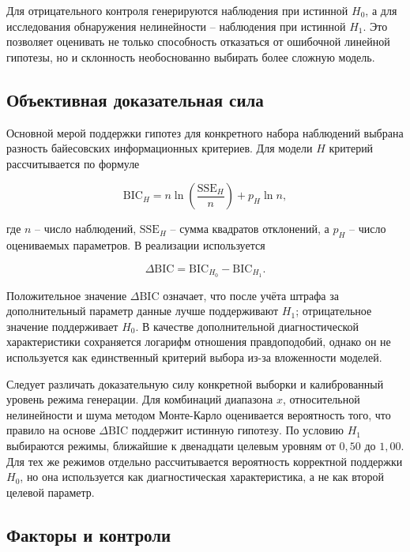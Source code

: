 \documentclass[a4paper,14pt]{extarticle}
\newcommand{\Hnull}{\ensuremath{H_0}}
\newcommand{\Hone}{\ensuremath{H_1}}
\newcommand{\DeltaBIC}{\ensuremath{\Delta\mathrm{BIC}}}
\begin{document}
Для отрицательного контроля генерируются наблюдения при истинной \Hnull, а для исследования обнаружения нелинейности -- наблюдения при истинной \Hone. Это позволяет оценивать не только способность отказаться от ошибочной линейной гипотезы, но и склонность необоснованно выбирать более сложную модель.

\subsection{Объективная доказательная сила}

Основной мерой поддержки гипотез для конкретного набора наблюдений выбрана разность байесовских информационных критериев. Для модели $H$ критерий рассчитывается по формуле~\cite{schwarz}

\begin{equation}
  \mathrm{BIC}_H = n \ln\!\left(\frac{\mathrm{SSE}_H}{n}\right) + p_H \ln n,
\end{equation}

где $n$ -- число наблюдений, $\mathrm{SSE}_H$ -- сумма квадратов отклонений, а $p_H$ -- число оцениваемых параметров. В реализации используется

\begin{equation}
  \DeltaBIC = \mathrm{BIC}_{H_0} - \mathrm{BIC}_{H_1}.
\end{equation}

Положительное значение \DeltaBIC{} означает, что после учёта штрафа за дополнительный параметр данные лучше поддерживают \Hone; отрицательное значение поддерживает \Hnull. В качестве дополнительной диагностической характеристики сохраняется логарифм отношения правдоподобий, однако он не используется как единственный критерий выбора из-за вложенности моделей.

Следует различать доказательную силу конкретной выборки и калиброванный уровень режима генерации. Для комбинаций диапазона $x$, относительной нелинейности и шума методом Монте-Карло оценивается вероятность того, что правило на основе \DeltaBIC{} поддержит истинную гипотезу. По условию \Hone{} выбираются режимы, ближайшие к двенадцати целевым уровням от $0{,}50$ до $1{,}00$. Для тех же режимов отдельно рассчитывается вероятность корректной поддержки \Hnull, но она используется как диагностическая характеристика, а не как второй целевой параметр.

\subsection{Факторы и контроли}
\end{document}
